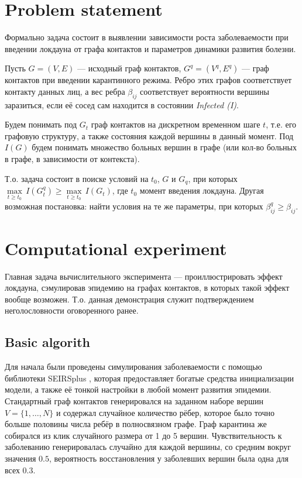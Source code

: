 	\section*{Problem statement}
	
	Формально задача состоит в выявлении зависимости роста заболеваемости при введении локдауна от графа контактов и параметров динамики развития болезни.
	
	Пусть $ G = (V, E) $ --- исходный граф контактов, $ G^q = (V^q, E^q) $ --- граф контактов при введении карантинного режима. Ребро этих графов соответствует контакту данных лиц, а вес ребра $ \beta_{ij} $ соответствует вероятности вершины заразиться, если её сосед сам находится в состоянии \textit{Infected (I)}. 
	
	Будем понимать под $ G_t $ граф контактов на дискретном временном шаге $ t $, т.е. его графовую структуру, а также состояния каждой вершины в данный момент. Под $ I(G) $ будем понимать множество больных вершин в графе (или кол-во больных в графе, в зависимости от контекста). 
	
	Т.о. задача состоит в поиске условий на $ t_0 $, $ G $ и $ G_q $, при которых $ \underset{t \ge t_0}{\max} \, I(G^q_t) \ge \underset{t \ge t_0}{\max} \, I(G_t) $, где $ t_0 $ момент введения локдауна. Другая возможная постановка: найти условия на те же параметры, при которых $ \beta_{ij}^q \ge \beta_{ij} $.
	
	\section*{Computational experiment}
	
	Главная задача вычислительного эксперимента --- проиллюстрировать эффект локдауна, сэмулировав эпидемию на графах контактов, в которых такой эффект вообще возможен. Т.о. данная демонстрация служит подтверждением неголословности оговоренного ранее.
	
	\subsection*{Basic algorith}
	
	Для начала были проведены симулирования заболеваемости с помощью библиотеки SEIRSplus \cite{seirsplus}, которая предоставляет богатые средства инициализации модели, а также её тонкой настройки в любой момент развития эпидемии. Стандартный граф контактов генерировался на заданном наборе вершин $ V = \{1, \ldots, N\} $ и содержал случайное количество рёбер, которое было точно больше половины числа ребёр в полносвязном графе. Граф карантина же собирался из клик случайного размера от 1 до 5 вершин. Чувствительность к заболеванию генерировалась случайно для каждой вершины, со средним вокруг значения $ 0.5 $, вероятность восстановления у заболевших вершин была одна для всех $ 0.3 $. 
	
